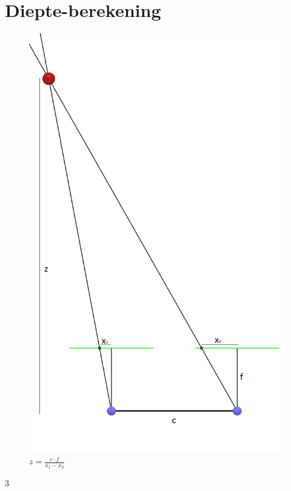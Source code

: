 \documentclass{peno-opdracht1}
\begin{document}
\section{Diepte-berekening} \label{App:Afstand}

\begin{figure}[h!]
	\begin{center}
		
		\includegraphics[scale=0.35]{Afstanden.png}
		\caption*{\(z = \frac{c \cdot f}{x_1 - x_2}\)}
	\end{center}
\end{figure}




3
\end{document}
